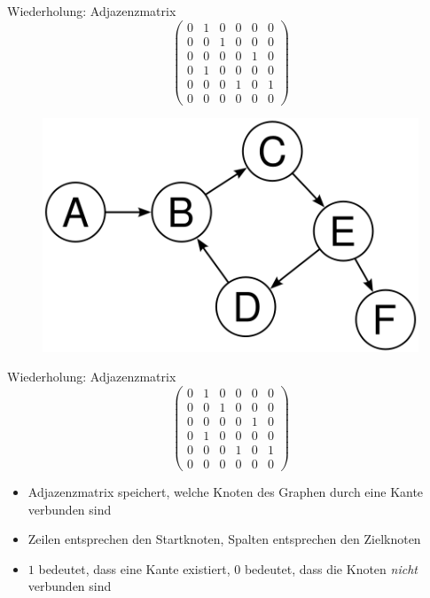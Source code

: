 \documentclass[18pt]{beamer}
\begin{document}
\begin{frame}{Wiederholung: Adjazenzmatrix}
    \[
    \left(
    \begin{array}{cccccc}
        0 & 1 & 0 & 0 & 0 & 0 \\
        0 & 0 & 1 & 0 & 0 & 0 \\
        0 & 0 & 0 & 0 & 1 & 0 \\
        0 & 1 & 0 & 0 & 0 & 0 \\
        0 & 0 & 0 & 1 & 0 & 1 \\
        0 & 0 & 0 & 0 & 0 & 0
    \end{array}
    \right)
    \]
    \begin{figure}
        \includegraphics[scale=.3]{img/graph.png}
    \end{figure}
\end{frame}

\begin{frame}{Wiederholung: Adjazenzmatrix}
    \[
    \left(
    \begin{array}{cccccc}
        0 & 1 & 0 & 0 & 0 & 0 \\
        0 & 0 & 1 & 0 & 0 & 0 \\
        0 & 0 & 0 & 0 & 1 & 0 \\
        0 & 1 & 0 & 0 & 0 & 0 \\
        0 & 0 & 0 & 1 & 0 & 1 \\
        0 & 0 & 0 & 0 & 0 & 0
    \end{array}
    \right)
    \]
    \begin{itemize}
        \item Adjazenzmatrix speichert, welche Knoten des Graphen durch eine Kante verbunden sind
        \item Zeilen entsprechen den Startknoten, Spalten entsprechen den Zielknoten
        \item $1$ bedeutet, dass eine Kante existiert, $0$ bedeutet, dass die Knoten \textit{nicht} verbunden sind
    \end{itemize}
\end{frame}
\end{document}
